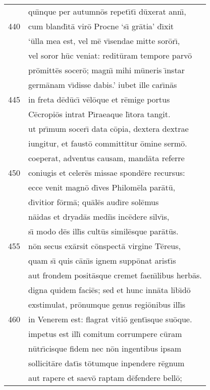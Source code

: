 \documentclass[paper=6in:9in,pagesize=pdftex,
               headinclude=on,footinclude=on,12pt]{scrbook}
\begin{document}
\begin{longtable}[p]{ r l }
 & qu\={\i}nque per autumn\=os repet\={\i}t\={\i} d\=uxerat ann\={\i},\\ 
440 & cum bland\={\i}t\=a vir\=o Procne `s\={\i} gr\=atia' d\={\i}xit\\ 
 & `\=ulla mea est, vel m\=e v\={\i}sendae mitte sor\=or\={\i},\\ 
 & vel soror h\=uc veniat: redit\=uram tempore parv\=o\\ 
 & pr\=omitt\=es socer\=o; magn\={\i} mihi m\=uneris \={\i}nstar\\ 
 & germ\=anam v\={\i}disse dabis.' iubet ille car\={\i}n\=as\\ 
445 & in freta d\=ed\=uc\={\i} v\=el\=oque et r\=emige portus\\ 
 & C\=ecropi\=os intrat P\={\i}raeaque l\={\i}tora tangit.\\ 
 & ut pr\={\i}mum socer\={\i} data c\=opia, dextera dextrae\\ 
 & iungitur, et faust\=o committitur \=omine serm\=o.\\ 
 & coeperat, adventus causam, mand\=ata referre\\ 
450 & coniugis et celer\=es missae spond\=ere recursus:\\ 
 & ecce venit magn\=o d\={\i}ves Philom\=ela par\=at\=u,\\ 
 & d\={\i}vitior f\=orm\=a; qu\=al\=es aud\={\i}re sol\=emus\\ 
 & n\=aidas et dryad\=as medi\={\i}s inc\=edere silv\={\i}s,\\ 
 & s\={\i} modo d\=es ill\={\i}s cult\=us simil\=esque par\=at\=us.\\ 
455 & n\=on secus ex\=arsit c\=onspect\=a virgine T\=ereus,\\ 
 & quam s\={\i} quis c\=an\={\i}s ignem supp\=onat arist\={\i}s\\ 
 & aut frondem posit\=asque cremet faen\={\i}libus herb\=as.\\ 
 & digna quidem faci\=es; sed et hunc inn\=ata lib\={\i}d\=o\\ 
 & exstimulat, pr\=onumque genus regi\=onibus ill\={\i}s\\ 
460 & in Venerem est: flagrat viti\=o gent\={\i}sque su\=oque.\\ 
 & impetus est ill\={\i} comitum corrumpere c\=uram\\ 
 & n\=utr\={\i}cisque fidem nec n\=on ingentibus ipsam\\ 
 & sollicit\=are dat\={\i}s t\=otumque inpendere r\=egnum\\ 
 & aut rapere et saev\=o raptam d\=efendere bell\=o;\\ 

\end{longtable}
\end{document}
